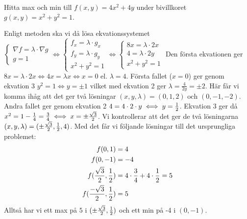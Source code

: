 \documentclass[a4paper]{article}
\begin{document}
\begin{ex}
    Hitta max och min till \(
        f(x,y) = 4x^2+4y
    \) under bivillkoret \(
        g(x,y) = x^2+y^2 = 1
    \).

    Enligt metoden ska vi då lösa ekvationssystemet 
    \(
        \left\{\begin{matrix}
            \nabla f = \lambda \cdot \nabla g\\ 
            g = 1
        \end{matrix}\right. 
        \iff 
        \left\{\begin{matrix}
            f_x = \lambda \cdot g_x \\
            f_y = \lambda \cdot g_y \\ 
            x^2+y^2 = 1
        \end{matrix}\right.
        \iff 
        \left\{\begin{matrix}
            8x = \lambda \cdot 2x \\
            4 = \lambda \cdot 2y \\
            x^2+y^2 = 1
        \end{matrix}\right.
    \) Den första ekvationen ger \(
        8x = \lambda \cdot 2x \iff 4x = \lambda x \iff x = 0 \text{ el. } \lambda = 4 
    \). Första fallet (\(
        x=0
    \)) ger genom ekvation 3 \(
        y^2 = 1 \iff y = \pm 1
    \) vilket med ekvation 2 ger \(
        \lambda = \frac{4}{2y} = \pm 2
    \). Här får vi komma ihåg att det ger två lösningar \(
        (x,y,\lambda) = (0,1,2) \text{ och } (0,-1,-2)
    \). Andra fallet ger genom ekvation 2 \(
        4 = 4 \cdot 2 \cdot y \iff y = \frac{1}{2}
    \). Ekvation 3 ger då \(
        x^2 = 1 - \frac{1}{4} =\frac{3}{4} \iff x = \pm \frac{\sqrt{3}}{2}
    \). Vi kontrollerar att det ger de två lösningarna \(
        (x,y,\lambda) = (\pm \frac{\sqrt{3}}{2}, \frac{1}{2}, 4) 
    \). Med det får vi följande lösningar till det ursprungliga problemet:
    \begin{align*}
        f(0,1) &= 4 \\
        f(0,-1) &= -4 \\
        f(\frac{\sqrt{3}}{2}, \frac{1}{2}) &= 4 \cdot \frac{3}{4} + 4 \cdot \frac{1}{2} = 5 \\
        f(\frac{-\sqrt{3}}{2}, \frac{1}{2}) &= 5 
    \end{align*}
    Alltså har vi ett max på \(
        5
    \) i \(
        (\pm\frac{\sqrt{3}}{2}, \frac{1}{2})
    \) och ett min på -4 i \(
        (0, -1)
    \).
\end{ex}
\end{document}
